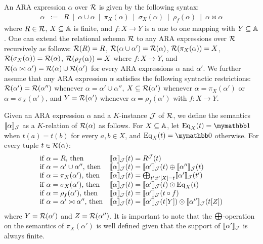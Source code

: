 An ARA expression $\alpha$ over $\mathcal{R}$ is given by the following syntax:
$$
\begin{array}{rcl}
\alpha & := & R \ \mid \ \alpha \cup \alpha \ \mid \  \pi_X(\alpha) \ \mid \  \sigma_X(\alpha) \ \mid \ \rho_f(\alpha) \ \mid \ \alpha \bowtie \alpha
\end{array}
$$
where $R \in \mathcal{R}$, $X \subseteq \mathbb{A}$ is finite, and $f: X \rightarrow Y$ is a one to one mapping with $Y \subseteq \mathbb{A}$. One can extend the relational schema $\mathcal{R}$ to any ARA expressions over $\mathcal{R}$ recursively as follows: $\mathcal{R}(R) = R$, $\mathcal{R}(\alpha \cup \alpha') = \mathcal{R}(\alpha)$, $\mathcal{R}(\pi_X(\alpha)) = X$, $\mathcal{R}(\sigma_X(\alpha)) = \mathcal{R}(\alpha)$, $\mathcal{R}(\rho_f(\alpha)) = X$ where $f:X \rightarrow Y$, and $\mathcal{R}(\alpha \bowtie \alpha') = \mathcal{R}(\alpha) \cup \mathcal{R}(\alpha')$ for every ARA expressions $\alpha$ and $\alpha'$.
We further assume that any ARA expression $\alpha$ satisfies the following syntactic restrictions: $\mathcal{R}(\alpha') = \mathcal{R}(\alpha'')$ whenever $\alpha = \alpha' \cup \alpha''$, $X \subseteq \mathcal{R}(\alpha')$ whenever $\alpha = \pi_X(\alpha')$ or $\alpha = \sigma_X(\alpha')$, and $Y = \mathcal{R}(\alpha')$ whenever $\alpha = \rho_f(\alpha')$ with $f: X \rightarrow Y$.

Given an ARA expression $\alpha$ and a $K$-instance $\mathcal{J}$ of $\mathcal{R}$, we define the semantics $\llbracket \alpha \rrbracket_{\mathcal{J}}$ as a $K$-relation of $\mathcal{R}(\alpha)$ as follows. For $X \subseteq \mathbb{A}$, let $\operatorname{Eq}_X(t) = \kone$ when $t(a) = t(b)$ for every $a, b \in X$, and $\operatorname{Eq}_X(t) = \kzero$ otherwise. For every tuple $t \in \mathcal{R}(\alpha)$:
$$
\begin{array}{ll}
\text{if $\alpha = R$, then} & \llbracket \alpha \rrbracket_{\mathcal{J}}(t) = R^{\mathcal{J}}(t) \\
\text{if $\alpha = \alpha' \cup \alpha''$, then} & \llbracket \alpha \rrbracket_{\mathcal{J}}(t) = \llbracket \alpha' \rrbracket_{\mathcal{J}}(t) \oplus \llbracket \alpha'' \rrbracket_{\mathcal{J}}(t)  \\
\text{if $\alpha = \pi_X(\alpha')$, then} & \llbracket \alpha \rrbracket_{\mathcal{J}}(t) = \bigoplus_{t': t'[X] = t} \llbracket \alpha' \rrbracket_{\mathcal{J}}(t') \\
\text{if $\alpha = \sigma_X(\alpha')$, then} & \llbracket \alpha \rrbracket_{\mathcal{J}}(t) = 
\llbracket \alpha' \rrbracket_{\mathcal{J}}(t) \odot \operatorname{Eq}_X(t)  \\
\text{if $\alpha = \rho_f(\alpha')$, then} & \llbracket \alpha \rrbracket_{\mathcal{J}}(t) = 
\llbracket \alpha' \rrbracket_{\mathcal{J}}(t \circ f)  
\\
\text{if $\alpha = \alpha' \bowtie \alpha''$, then} & \llbracket \alpha \rrbracket_{\mathcal{J}}(t) =  \llbracket \alpha' \rrbracket_{\mathcal{J}}(t[Y]) \odot  \llbracket \alpha'' \rrbracket_{\mathcal{J}}(t[Z])
\end{array}
$$
where $Y = \mathcal{R}(\alpha')$ and $Z = \mathcal{R}(\alpha'')$. It is important to note that the $\bigoplus$-operation on the semantics of $\pi_X(\alpha')$ is well defined given that the support of $\llbracket \alpha' \rrbracket_{\mathcal{J}}$ is always finite. 

